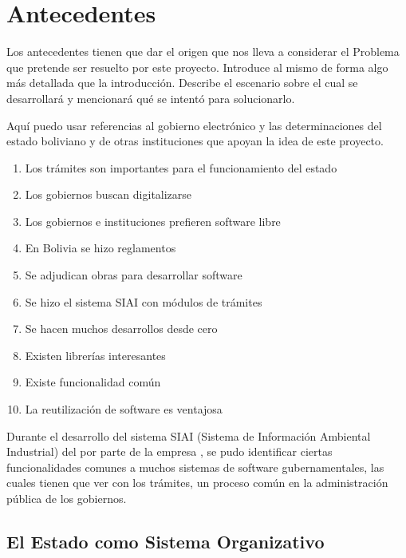 \section{Antecedentes}

\begin{tcolorbox}[breakable]

    Los antecedentes tienen que dar el origen que nos lleva a considerar el Problema
    que pretende ser resuelto por este proyecto. Introduce al mismo de forma
    algo más detallada que la introducción.
    Describe el escenario sobre el cual se desarrollará y mencionará qué se intentó para solucionarlo.

    Aquí puedo usar referencias al gobierno electrónico y las determinaciones
    del estado boliviano y de otras instituciones que apoyan la idea de este
    proyecto.

    \begin{enumerate}
        \item Los trámites son importantes para el funcionamiento del estado
        \item Los gobiernos buscan digitalizarse
        \item Los gobiernos e instituciones prefieren software libre
        \item En Bolivia se hizo reglamentos
        \item Se adjudican obras para desarrollar software
        \item Se hizo el sistema SIAI con módulos de trámites
        \item Se hacen muchos desarrollos desde cero
        \item Existen librerías interesantes
        \item Existe funcionalidad común
        \item La reutilización de software es ventajosa
    \end{enumerate}

\end{tcolorbox}

Durante el desarrollo del sistema SIAI (Sistema de Información Ambiental
Industrial) del  por
parte de la empresa , se pudo identificar ciertas funcionalidades
comunes a muchos sistemas de software gubernamentales, las cuales tienen que ver
con los trámites, un proceso común en la administración pública de los
gobiernos.

\subsection{El Estado como Sistema Organizativo}

